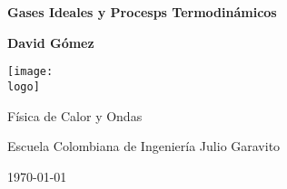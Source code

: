 \documentclass{article}
\newcommand{\logo}{"logo-eci-invert.png"}
\newcommand{\titlename}{Gases Ideales y Procesps Termodinámicos}
\renewcommand{\author}{{David Gómez}}
\begin{document}
\begin{titlepage}
    \begin{center}
        \vspace{1cm}

        \textbf{\Huge{\titlename}}

        \vspace{1.5cm}

        \textbf{\large{\author}}

        \vspace{3cm}

        \texttt{[image: \\logo]}
        
        \vfill

        Física de Calor y Ondas

        Escuela Colombiana de Ingeniería Julio Garavito

        \today
    \end{center}
\end{titlepage}

\clearpage
\tableofcontents








\end{document}
